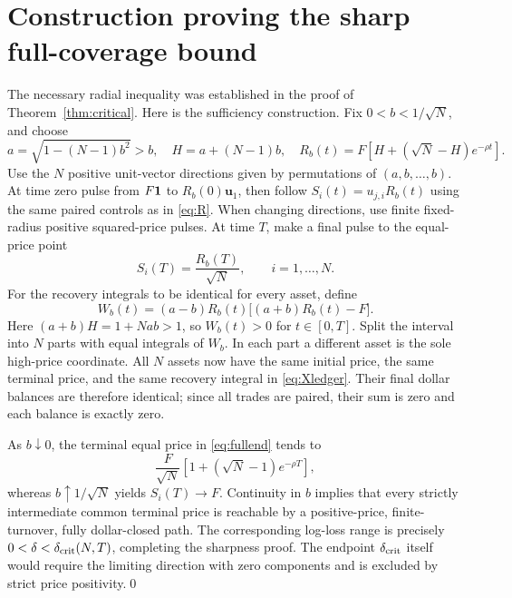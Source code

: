 \documentclass[review,hidelinks,onefignum,onetabnum]{siamonline250211}
\begin{document}
\section{Construction proving the sharp full-coverage bound}\label{app:sharp}
The necessary radial inequality was established in the proof of Theorem~\ref{thm:critical}. Here is the sufficiency construction. Fix $0<b<1/\sqrt N$, and choose
\begin{equation}\label{eq:fullab}
a=\sqrt{1-(N-1)b^2}>b,
\quad H=a+(N-1)b,
\quad R_b(t)=F\left[H+(\sqrt N-H)e^{-\rho t}\right].
\end{equation}
Use the $N$ positive unit-vector directions given by permutations of $(a,b,\ldots,b)$. At time zero pulse from $F\mathbf{1}$ to $R_b(0)\bm u_1$, then follow $S_i(t)=u_{j,i}R_b(t)$ using the same paired controls as in \eqref{eq:R}. When changing directions, use finite fixed-radius positive squared-price pulses. At time $T$, make a final pulse to the equal-price point
\begin{equation}\label{eq:fullend}
S_i(T)=\frac{R_b(T)}{\sqrt N},\qquad i=1,\ldots,N.
\end{equation}
For the recovery integrals to be identical for every asset, define
\begin{equation}\label{eq:fullW}
W_b(t)=(a-b)R_b(t)\big[(a+b)R_b(t)-F\big].
\end{equation}
Here $(a+b)H=1+Nab>1$, so $W_b(t)>0$ for $t\in[0,T]$. Split the interval into $N$ parts with equal integrals of $W_b$. In each part a different asset is the sole high-price coordinate. All $N$ assets now have the same initial price, the same terminal price, and the same recovery integral in \eqref{eq:Xledger}. Their final dollar balances are therefore identical; since all trades are paired, their sum is zero and each balance is exactly zero.

As $b\downarrow0$, the terminal equal price in \eqref{eq:fullend} tends to
\[
\frac{F}{\sqrt N}\left[1+(\sqrt N-1)e^{-\rho T}\right],
\]
whereas $b\uparrow1/\sqrt N$ yields $S_i(T)\to F$. Continuity in $b$ implies that every strictly intermediate common terminal price is reachable by a positive-price, finite-turnover, fully dollar-closed path. The corresponding log-loss range is precisely $0<\delta<\delta_{\rm crit}(N,T)$, completing the sharpness proof. The endpoint $\delta_{\rm crit}$ itself would require the limiting direction with zero components and is excluded by strict price positivity.\qed
\end{document}
